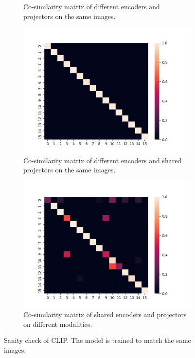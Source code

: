 \documentclass[a4paper,11pt,oneside]{report}
\begin{document}
\begin{figure}[hbt]
\begin{subfigure}[t]{0.3\textwidth}
        \caption{Co-similarity matrix of different encoders and projectors on the same images.}
        \label{fig:clip-cosimilarity-diff-enc-proj}
    \end{subfigure}%
    \hfill
    \begin{subfigure}[t]{0.3\textwidth}
        \centering
        \includegraphics[width=0.9\linewidth]{figures/discussion_clip_same_image_diff_enc_shared_proj_logits.png}
        \caption{Co-similarity matrix of different encoders and shared projectors on the same images.}
        \label{fig:clip-cosimilarity-same-enc-proj}
    \end{subfigure}%
    \hfill
    \begin{subfigure}[t]{0.3\textwidth}
        \centering
        \includegraphics[width=0.9\linewidth]{figures/discussion_clip_same_image_shared_enc_shared_proj_logits.png}
        \caption{Co-similarity matrix of shared encoders and projectors on different modalities.}
        \label{fig:clip-cosimilarity-shared-enc-proj}
    \end{subfigure}
    \caption{Sanity check of CLIP. The model is trained to match the same images.}
    \label{fig:clip-sanity-check}
\end{figure}
\end{document}
